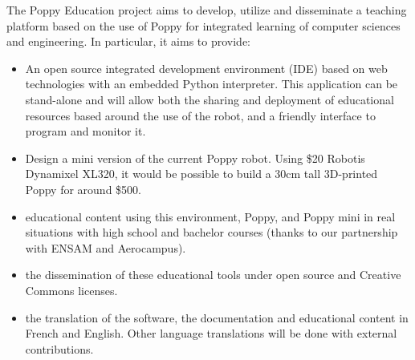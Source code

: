 The Poppy Education project aims to develop, utilize and disseminate a teaching platform based on the use of Poppy for integrated learning of computer sciences and engineering. In particular, it aims to provide:
\begin{itemize}
    \item An open source integrated development environment (IDE) based on web technologies with an embedded Python interpreter. This application can be stand-alone and will allow both the sharing and deployment of educational resources based around the use of the robot, and a friendly interface to program and monitor it.
    \item Design a mini version of the current Poppy robot. Using \$20 Robotis Dynamixel XL320, it would be possible to build a 30cm tall 3D-printed Poppy for around \$500.
    \item educational content using this environment, Poppy, and Poppy mini in real situations with high school and bachelor courses (thanks to our partnership with ENSAM and Aerocampus).
    \item the dissemination of these educational tools under open source and Creative Commons licenses.
    \item the translation of the software, the documentation and educational content in French and English. Other language translations will be done with external contributions.
\end{itemize}







